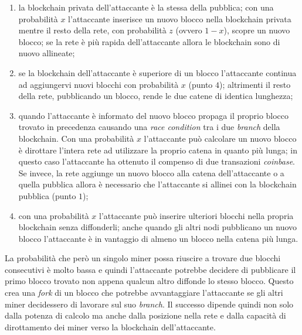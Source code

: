 \begin{enumerate}
    \item la blockchain privata dell'attaccante è la stessa della pubblica; con una probabilità $x$ l'attaccante inserisce un nuovo blocco nella blockchain privata mentre il resto della rete, con probabilità $z$ (ovvero $1-x$), scopre un nuovo blocco; se la rete è più rapida dell'attaccante allora le blockchain sono di nuovo allineate;
    \item se la blockchain dell'attaccante è superiore di un blocco l'attaccante continua ad aggiungervi nuovi blocchi con probabilità $x$ (punto $4$); altrimenti il resto della rete, pubblicando un blocco, rende le due catene di identica lunghezza;
    \item quando l'attaccante è informato del nuovo blocco propaga il proprio blocco trovato in precedenza causando una \textit{race condition} tra i due \textit{branch} della blockchain. Con una probabilità $x$ l'attaccante può calcolare un nuovo blocco è dirottare l'intera rete ad utilizzare la proprio catena in quanto più lunga; in questo caso l'attaccante ha ottenuto il compenso di due transazioni \textit{coinbase}. Se invece, la rete aggiunge un nuovo blocco alla catena dell'attaccante o a quella pubblica allora è necessario che l'attaccante si allinei con la blockchain pubblica (punto $1$);
    \item con una probabilità $x$ l'attaccante può inserire ulteriori blocchi nella propria blockchain senza diffonderli; anche quando gli altri nodi pubblicano un nuovo blocco l'attaccante è in vantaggio di almeno un blocco nella catena più lunga.
\end{enumerate}
La probabilità che però un singolo miner possa riuscire a trovare due blocchi consecutivi è molto bassa e quindi l'attaccante potrebbe decidere di pubblicare il primo blocco trovato non appena qualcun altro diffonde lo stesso blocco. Questo crea una \textit{fork} di un blocco che potrebbe avvantaggiare l'attaccante se gli altri miner decidessero di lavorare sul suo \textit{branch}. Il successo dipende quindi non solo dalla potenza di calcolo ma anche dalla posizione nella rete e dalla capacità di dirottamento dei miner verso la blockchain dell'attaccante.\newline
